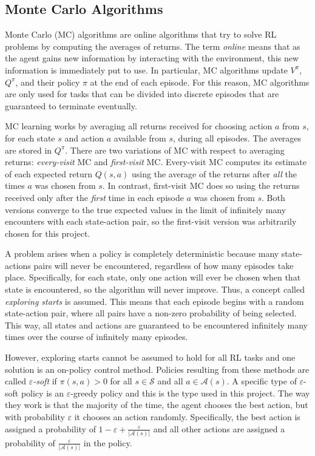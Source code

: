 \documentclass[11pt,a4paper,twoside,openright]{report}
\begin{document}
\subsection{Monte Carlo Algorithms}
\label{sec:MonteCarloAlgorithms}

Monte Carlo (MC) algorithms are online algorithms that try to solve RL problems by computing the averages of returns. The term \emph{online} means that as the agent gains new information by interacting with the environment, this new information is immediately put to use. In particular, MC algorithms update $V^{\pi}$, $Q^{\pi}$, and their policy $\pi$ at the end of each episode. For this reason, MC algorithms are only used for tasks that can be divided into discrete episodes that are guaranteed to terminate eventually.

MC learning works by averaging all returns received for choosing action $a$ from $s$, for each state $s$ and action $a$ available from $s$, during all episodes. The averages are stored in $Q^{\pi}$. There are two variations of MC with respect to averaging returns: \emph{every-visit} MC and \emph{first-visit} MC. Every-visit MC computes its estimate of each expected return $Q(s,a)$ using the average of the returns after \emph{all} the times $a$ was chosen from $s$. In contrast, first-visit MC does so using the returns received only after the \emph{first} time in each episode $a$ was chosen from $s$. Both versions converge to the true expected values in the limit of infinitely many encounters with each state-action pair, so the first-visit version was arbitrarily chosen for this project.

A problem arises when a policy is completely deterministic because many state-actions pairs will never be encountered, regardless of how many episodes take place. Specifically, for each state, only one action will ever be chosen when that state is encountered, so the algorithm will never improve. Thus, a concept called \emph{exploring starts} is assumed. This means that each episode begins with a random state-action pair, where all pairs have a non-zero probability of being selected. This way, all states and actions are guaranteed to be encountered infinitely many times over the course of infinitely many episodes.

However, exploring starts cannot be assumed to hold for all RL tasks and one solution is an on-policy control method. Policies resulting from these methods are called \emph{$\varepsilon$-soft} if $\pi(s,a) > 0$ for all $s \in \mathcal{S}$ and all $a \in \mathcal{A}(s)$. A specific type of $\varepsilon$-soft policy is an $\varepsilon$-greedy policy and this is the type used in this project. The way they work is that the majority of the time, the agent chooses the best action, but with probability $\varepsilon$ it chooses an action randomly. Specifically, the best action is assigned a probability of $1 - \varepsilon + \frac{\varepsilon}{|\mathcal{A}(s)|}$ and all other actions are assigned a probability of $\frac{\varepsilon}{|\mathcal{A}(s)|}$ in the policy.
\end{document}
